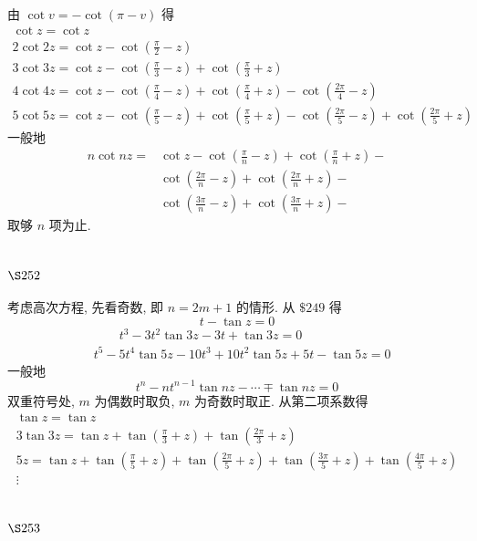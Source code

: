 由 $\cot v=-\cot (\pi-v)$ 得
\[
\begin{gathered}
\cot z=\cot z \\
2 \cot 2 z=\cot z-\cot \left(\frac{\pi}{2}-z\right) \\
3 \cot 3 z=\cot z-\cot \left(\frac{\pi}{3}-z\right)+\cot \left(\frac{\pi}{3}+z\right) \\
4 \cot 4 z=\cot z-\cot \left(\frac{\pi}{4}-z\right)+\cot \left(\frac{\pi}{4}+z\right)-\cot \left(\frac{2 \pi}{4}-z\right) \\
5 \cot 5 z=\cot z-\cot \left(\frac{\pi}{5}-z\right)+\cot \left(\frac{\pi}{5}+z\right)-\cot \left(\frac{2 \pi}{5}-z\right)+\cot \left(\frac{2 \pi}{5}+z\right)
\end{gathered}
\]
一般地
\[
\begin{aligned}
n \cot n z= & \cot z-\cot \left(\frac{\pi}{n}-z\right)+\cot \left(\frac{\pi}{n}+z\right)- \\
& \cot \left(\frac{2 \pi}{n}-z\right)+\cot \left(\frac{2 \pi}{n}+z\right)- \\
& \cot \left(\frac{3 \pi}{n}-z\right)+\cot \left(\frac{3 \pi}{n}+z\right)-
\end{aligned}
\]
取够 $n$ 项为止.

\section{$\S 252$}

考虑高次方程, 先看奇数, 即 $n=2 m+1$ 的情形. 从 $\$ 249$ 得
\[
t-\tan z=0
\]
\[
\begin{aligned}
& \qquad t^{3}-3 t^{2} \tan 3 z-3 t+\tan 3 z=0 \\
& t^{5}-5 t^{4} \tan 5 z-10 t^{3}+10 t^{2} \tan 5 z+5 t-\tan 5 z=0
\end{aligned}
\]
一般地
\[
t^{n}-n t^{n-1} \tan n z-\cdots \mp \tan n z=0
\]
双重符号处, $m$ 为偶数时取负, $m$ 为奇数时取正. 从第二项系数得
\[
\begin{gathered}
\tan z=\tan z \\
3 \tan 3 z=\tan z+\tan \left(\frac{\pi}{3}+z\right)+\tan \left(\frac{2 \pi}{3}+z\right) \\
5 z=\tan z+\tan \left(\frac{\pi}{5}+z\right)+\tan \left(\frac{2 \pi}{5}+z\right)+\tan \left(\frac{3 \pi}{5}+z\right)+\tan \left(\frac{4 \pi}{5}+z\right) \\
\vdots
\end{gathered}
\]
\section{$\S 253$}


